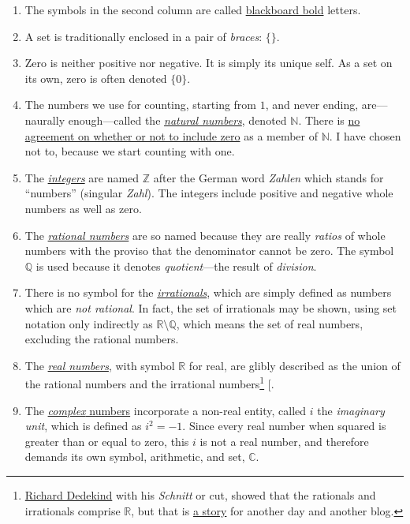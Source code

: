 \documentclass[
  a4paper,
]{article}
\begin{document}
\begin{enumerate}
\item
  The symbols in the second column are called
  \href{https://oeis.org/wiki/Blackboard_bold}{blackboard bold} letters.
\item
  A set is traditionally enclosed in a pair of \emph{braces}: \(\{\}\).
\item
  Zero is neither positive nor negative. It is simply its unique self.
  As a set on its own, zero is often denoted \(\{0\}\).
\item
  The numbers we use for counting, starting from \(1\), and never
  ending, are---naurally enough---called the
  \href{https://mathworld.wolfram.com/NaturalNumber.html}{\emph{natural
  numbers}}, denoted \(\mathbb{N}\). There is
  \href{https://en.wikipedia.org/wiki/Natural_number}{no agreement on
  whether or not to include zero} as a member of \(\mathbb{N}\). I have
  chosen not to, because we start counting with one.
\item
  The \href{https://en.wikipedia.org/wiki/Integer}{\emph{integers}} are
  named \(\mathbb{Z}\) after the German word \emph{Zahlen} which stands
  for ``numbers'' (singular \emph{Zahl}). The integers include positive
  and negative whole numbers as well as zero.
\item
  The
  \href{https://mathworld.wolfram.com/RationalNumber.html}{\emph{rational
  numbers}} are so named because they are really \emph{ratios} of whole
  numbers with the proviso that the denominator cannot be zero. The
  symbol \(\mathbb{Q}\) is used because it denotes \emph{quotient}---the
  result of \emph{division}.
\item
  There is no symbol for the
  \href{https://mathworld.wolfram.com/IrrationalNumber.html}{\emph{irrationals}},
  which are simply defined as numbers which are \emph{not rational}. In
  fact, the set of irrationals may be shown, using set notation only
  indirectly as \(\mathbb{R}\setminus\mathbb{Q}\), which means the set
  of real numbers, excluding the rational numbers.
\item
  The \href{https://en.wikipedia.org/wiki/Real_number}{\emph{real
  numbers}}, with symbol \(\mathbb{R}\) for real, are glibly described
  as the union of the rational numbers and the irrational
  numbers\footnote{\href{https://en.wikipedia.org/wiki/Richard_Dedekind}{Richard
    Dedekind} with his \emph{Schnitt} or cut, showed that the rationals
    and irrationals comprise \(\mathbb{R}\), but that is
    \href{https://arpita95b.medium.com/cutting-through-the-confusion-how-dedekind-cuts-build-the-real-numbers-20aeaaec021d}{a
    story} for another day and another blog.}
  {[}\citeproc{ref-arpita2023}{1}{]}.
\item
  The \href{https://en.wikipedia.org/wiki/Complex_number}{\emph{complex}
  numbers} incorporate a non-real entity, called \(i\) the
  \emph{imaginary unit}, which is defined as \(i^2 = -1\). Since every
  real number when squared is greater than or equal to zero, this \(i\)
  is not a real number, and therefore demands its own symbol,
  arithmetic, and set, \(\mathbb{C}\).
\end{enumerate}
\end{document}
